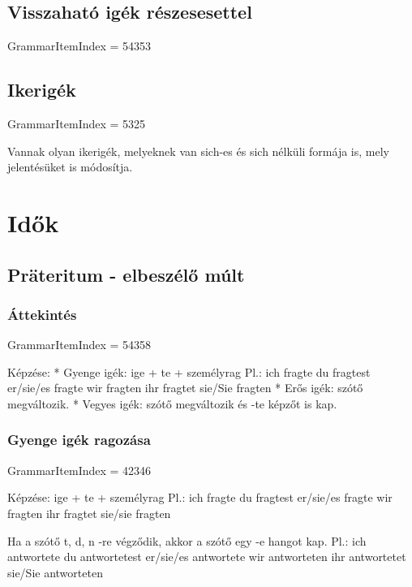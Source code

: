\documentclass{article}
\newenvironment{desc}{\verbatim}{\endverbatim}
\begin{document}
\subsection{Visszaható igék részesesettel}

GrammarItemIndex = 54353

\subsection{Ikerigék}

GrammarItemIndex = 5325

\begin{desc}
Vannak olyan ikerigék, melyeknek van sich-es és sich nélküli
formája is, mely jelentésüket is módosítja.
\end{desc}

\section{Idők}

\subsection{Präteritum - elbeszélő múlt}

\subsubsection{Áttekintés}

GrammarItemIndex = 54358

\begin{desc}
Képzése:
* Gyenge igék: ige + te + személyrag
  Pl.: ich fragte 
       du fragtest 
       er/sie/es fragte 
       wir fragten 
       ihr fragtet 
       sie/Sie fragten
* Erős igék: szótő megváltozik.
* Vegyes igék: szótő megváltozik és -te képzőt is kap.
\end{desc}

\subsubsection{Gyenge igék ragozása}

GrammarItemIndex = 42346

\begin{desc}
Képzése: ige + te + személyrag
Pl.:
ich fragte
du fragtest
er/sie/es fragte
wir fragten
ihr fragtet
sie/sie fragten

Ha a szótő t, d, n -re végződik, akkor a szótő egy -e hangot kap.
Pl.:
ich antwortete
du antwortetest
er/sie/es antwortete
wir antworteten
ihr antwortetet
sie/Sie antworteten
\end{desc}
\end{document}

